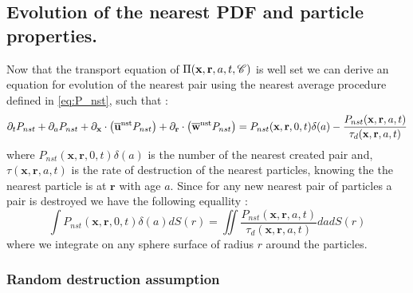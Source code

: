 \subsection{Evolution of the nearest PDF and particle properties.}

Now that the transport equation of $\Pi(\textbf{x},\textbf{r},a,t,\mathscr{C})$ is well set we can derive an equation for evolution of the nearest pair using the nearest average procedure defined in \ref{eq:P_nst}, such that : 
\begin{equation}
    \partial_t P_{nst} 
    + \partial_a P_{nst} 
    + \partial_\textbf{x} \cdot \left(\overline{\textbf{u}}^\text{nst} P_{nst}\right) 
    + \partial_\textbf{r} \cdot \left( \overline{\textbf{w}}^\text{nst} P_{nst} \right) 
    =   P_{nst}(\textbf{x},\textbf{r},0,t)\delta(a)
    - \frac{P_{nst}(\textbf{x},\textbf{r},a,t)}{\tau_d(\textbf{x},\textbf{r},a,t)}
    \label{eq:dt_P_nst}
\end{equation}
where $P_{nst}(\textbf{x},\textbf{r},0,t)\delta(a)$ is the number of the nearest created pair and,
 $\tau(\textbf{x},\textbf{r},a,t)$ is the rate of destruction of the nearest particles, knowing the the nearest particle is at $\textbf{r}$ with age $a$.
Since for any new nearest pair of particles a pair is destroyed we have the following equallity :
 \begin{equation}
    \int P_{nst}(\textbf{x},\textbf{r},0,t)\delta(a) dS(r)
    =\iint \frac{P_{nst}(\textbf{x},\textbf{r},a,t)}{\tau_d(\textbf{x},\textbf{r},a,t)}
    dadS(r)
 \end{equation}
where we integrate on any sphere surface of radius $r$ around the particles. 

\subsubsection{Random destruction assumption}


